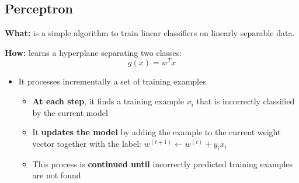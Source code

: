 \documentclass[12pt, a4paper]{article}
\begin{document}
\subsection{Perceptron}\label{perceptron}

\textbf{What:} is a simple algorithm to train linear classifiers on linearly separable data.

\textbf{How:} learns a hyperplane separating two classes:
$$
g(x) = w^T x
$$

\begin{itemize}
  \item It processes incrementally a set of training examples
  \begin{itemize}
    \item \textbf{At each step}, it finds a training example $x_i$ that is incorrectly classified by the current model
    \item It \textbf{updates the model} by adding the example to the current weight vector together with the label: $w^{(t+1)} \leftarrow w^{(t)} + y_i x_i$
    \item This process is \textbf{continued until} incorrectly predicted training examples are not found
  \end{itemize}
\end{itemize}
\end{document}
